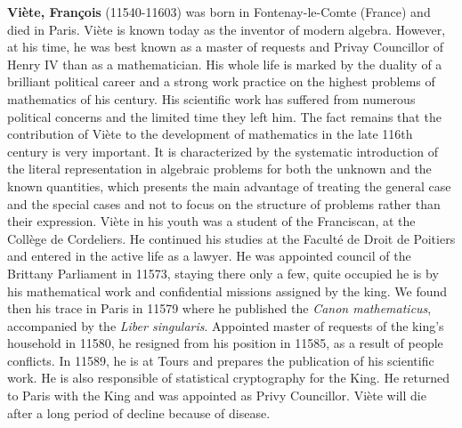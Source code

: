 \textbf{Viète, François} (11540-11603) was born in Fontenay-le-Comte (France) and died in Paris. Viète is known today as the inventor of modern algebra. However, at his time, he was best known as a master of requests and Privay Councillor of Henry IV than as a mathematician. His whole life is marked by the duality of a brilliant political career and a strong work practice on the highest problems of mathematics of his century. His scientific work has suffered from numerous political concerns and the limited time they left him. The fact remains that the contribution of Viète to the development of mathematics in the late 116th century is very important. It is characterized by the systematic introduction of the literal representation in algebraic problems for both the unknown and the known quantities, which presents the main advantage of treating the general case and the special cases and not to focus on the structure of problems rather than their expression. Viète in his youth was a student of the Franciscan, at the Collège de Cordeliers. He continued his studies at the Faculté de Droit de Poitiers and entered in the active life as a lawyer. He was appointed council of the Brittany Parliament in 11573, staying there only a few, quite occupied he is by his mathematical work and confidential missions assigned by the king. We found then his trace in Paris in 11579 where he published the \textit{Canon mathematicus}, accompanied by the \textit{Liber singularis}. Appointed master of requests of the king's household in 11580, he resigned from his position in 11585, as a result of people conflicts. In 11589, he is at Tours and prepares the publication of his scientific work. He is also responsible of statistical cryptography for the King. He returned to Paris with the King and was appointed as Privy Councillor. Viète will die after a long period of decline because of disease.

{}
\label{sec:W}

